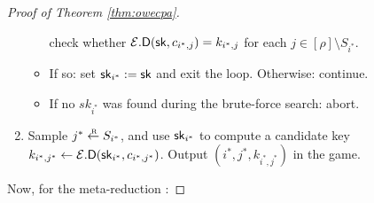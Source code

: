 \begin{proof}[Proof of Theorem \ref{thm:owecpa}]
\begin{enumerate}[itemsep=0.1cm]
\begin{itemize}[label={\textbullet},itemsep=0.1cm]
                  check whether \(\mathcal{E}.\mathsf{D}(\mathsf{sk},c_{i^{*},j}) = k_{i^{*},j}\) for each \(j \in [\rho] \setminus S_{i^{*}}\).
            \item If so: set \(\mathsf{sk}_{i^{*}} := \mathsf{sk}\) and exit the loop. Otherwise: continue.
            \item If no \(sk_{i^{*}}\) was found during the brute-force search: abort.
          \end{itemize}
    \item Sample \(j^{*} \sampleR S_{i^{*}}\),
          and use \(\mathsf{sk}_{i^{*}}\) to compute a candidate key \(k_{i^{*}, j^{*}} \leftarrow \mathcal{E}.\mathsf{D}(\mathsf{sk}_{i^{*}},c_{i^{*}, j^{*}})\).
          Output \((i^{*}, j^{*}, k_{i^{*}, j^{*}})\) in the \OWECPA game.
  \end{enumerate}

  Now, for the meta-reduction \redM:


\end{proof}
